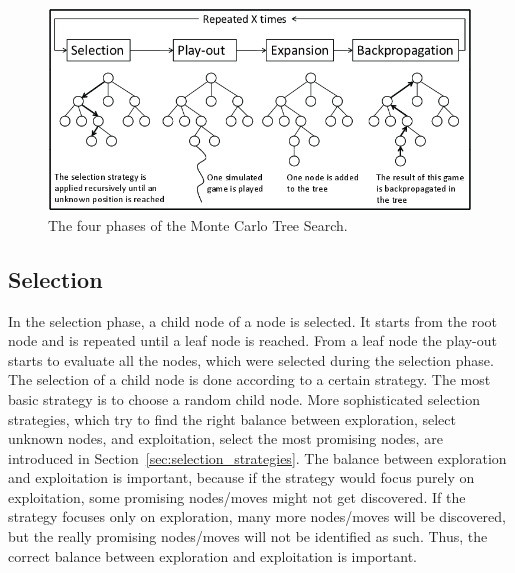 \documentclass{article}
\begin{document}
\begin{figure}[t]
\begin{center}
\includegraphics[width=\textwidth]{images/mcts_figure.png}
\caption{The four phases of the Monte Carlo Tree Search.\label{fig:mcts_figure}}
\end{center}
\end{figure}

\subsection{Selection}
\label{subsec:selection}
In the selection phase, a child node of a node is selected. It starts from the root node and is repeated until a leaf node is reached. From a leaf node the play-out starts to evaluate all the nodes, which were selected during the selection phase. The selection of a child node is done according to a certain strategy. The most basic strategy is to choose a random child node. More sophisticated selection strategies, which try to find the right balance between exploration, select unknown nodes, and exploitation, select the most promising nodes, are introduced in Section~\ref{sec:selection_strategies}. The balance between exploration and exploitation is important, because if the strategy would focus purely on exploitation, some promising nodes/moves might not get discovered. If the strategy focuses only on exploration, many more nodes/moves will be discovered, but the really promising nodes/moves will not be identified as such. Thus, the correct balance between exploration and exploitation is important.
\end{document}
